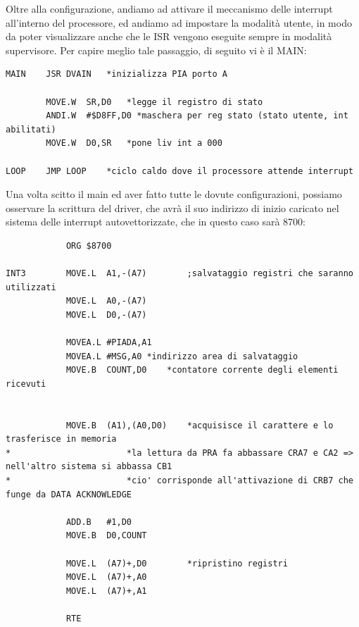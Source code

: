 Oltre alla configurazione, andiamo ad attivare il meccanismo delle interrupt all'interno del processore, ed andiamo ad impostare la modalità utente, in modo da poter visualizzare anche che le ISR vengono eseguite sempre in modalità supervisore. Per capire meglio tale passaggio, di seguito vi è il MAIN:
\begin{lstlisting}
MAIN	JSR	DVAIN	*inizializza PIA porto A
            
        MOVE.W	SR,D0	*legge il registro di stato
        ANDI.W	#$D8FF,D0 *maschera per reg stato (stato utente, int abilitati)
        MOVE.W	D0,SR	*pone liv int a 000

LOOP  	JMP LOOP	*ciclo caldo dove il processore attende interrupt	
\end{lstlisting}

Una volta scitto il main ed aver fatto tutte le dovute configurazioni, possiamo osservare la scrittura del driver, che avrà il suo indirizzo di inizio caricato nel sistema delle interrupt autovettorizzate, che in questo caso sarà 8700:
\begin{lstlisting}
            ORG $8700		

INT3        MOVE.L  A1,-(A7)		;salvataggio registri che saranno utilizzati
            MOVE.L  A0,-(A7)
            MOVE.L  D0,-(A7)

            MOVEA.L	#PIADA,A1
            MOVEA.L	#MSG,A0	*indirizzo area di salvataggio
            MOVE.B	COUNT,D0	*contatore corrente degli elementi ricevuti

    
            MOVE.B 	(A1),(A0,D0)	*acquisisce il carattere e lo trasferisce in memoria
*						*la lettura da PRA fa abbassare CRA7 e CA2 => nell'altro sistema si abbassa CB1
*						*cio' corrisponde all'attivazione di CRB7 che funge da DATA ACKNOWLEDGE
    
            ADD.B	#1,D0
            MOVE.B	D0,COUNT

            MOVE.L  (A7)+,D0		*ripristino registri 
            MOVE.L  (A7)+,A0
            MOVE.L  (A7)+,A1
            
            RTE
\end{lstlisting}